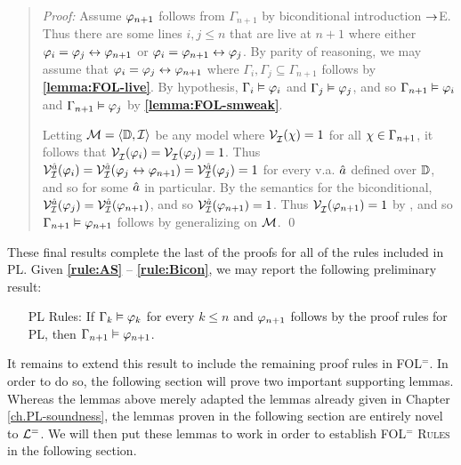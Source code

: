 
\begin{quote} 
  \textit{Proof:} Assume $\varphi_{n+1}$ follows from $\Gamma_{n+1}$ by biconditional introduction $\rightarrow$E.
Thus there are some lines $i,j\leq n$ that are live at $n+1$ where either $\varphi_i=\varphi_j\leftrightarrow\varphi_{n+1}$ or $\varphi_i=\varphi_{n+1}\leftrightarrow\varphi_j$.
  By parity of reasoning, we may assume that $\varphi_i=\varphi_j\leftrightarrow\varphi_{n+1}$ where $\Gamma_i,\Gamma_j\subseteq\Gamma_{n+1}$ follows by \textbf{\ref{lemma:FOL-live}}.
  By hypothesis, $\Gamma_i\vDash \varphi_i$ and $\Gamma_j\vDash \varphi_j$, and so $\Gamma_{n+1} \vDash \varphi_i$ and $\Gamma_{n+1} \vDash \varphi_j$ by \textbf{\ref{lemma:FOL-smweak}}.

  Letting $\mathcal{M}=\langle\mathbb{D},\mathcal{I}\rangle$ be any model where $\mathcal{V}_{\mathcal{I}}^{}(\chi) = 1$ for all $\chi \in \Gamma_{n+1}$, it follows that $\mathcal{V}_{\mathcal{I}}^{}(\varphi_i) = \mathcal{V}_{\mathcal{I}}^{}(\varphi_j) = 1$.
  Thus $\mathcal{V}_{\mathcal{I}}^{\hat{a}}(\varphi_i)=\mathcal{V}_{\mathcal{I}}^{\hat{a}}(\varphi_j\leftrightarrow\varphi_{n+1})=\mathcal{V}_{\mathcal{I}}^{\hat{a}}(\varphi_j)=1$ for every v.a. $\hat{a}$ defined over $\mathbb{D}$, and so for some $\hat{a}$ in particular. 
  By the semantics for the biconditional, $\mathcal{V}_{\mathcal{I}}^{\hat{a}}(\varphi_j)=\mathcal{V}_{\mathcal{I}}^{\hat{a}}(\varphi_{n+1})$, and so $\mathcal{V}_{\mathcal{I}}^{\hat{a}}(\varphi_{n+1})=1$.
  Thus $\mathcal{V}_{\mathcal{I}}^{}(\varphi_{n+1})=1$ by , and so $\Gamma_{n+1} \vDash \varphi_{n+1}$ follows by generalizing on $\mathcal{M}$.
  \qed
\end{quote}

These final results complete the last of the proofs for all of the rules included in PL.
Given \textbf{\ref{rule:AS}} -- \textbf{\ref{rule:Bicon}}, we may report the following preliminary result:

\begin{enumerate}[leftmargin=1.3in]
  \item[\sc PL Rules:] If $\Gamma_k \vDash \varphi_k$ for every $k\leq n$ and $\varphi_{n+1}$ follows by the proof rules for PL, then $\Gamma_{n+1} \vDash \varphi_{n+1}$.
\end{enumerate}

It remains to extend this result to include the remaining proof rules in FOL$^=$.
In order to do so, the following section will prove two important supporting lemmas.
Whereas the lemmas above merely adapted the lemmas already given in Chapter \ref{ch.PL-soundness}, the lemmas proven in the following section are entirely novel to $\mathcal{L}^{=}$.
We will then put these lemmas to work in order to establish \textsc{FOL$^=$ Rules} in the following section.



